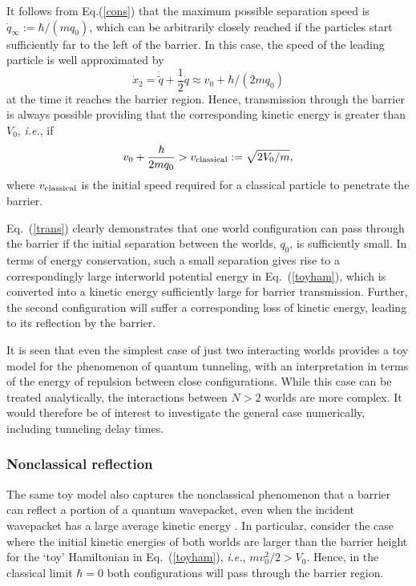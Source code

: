 \documentclass[twocolumn,aps,pra,amsmath,amssymb,superscriptaddress]{revtex4}
\newcommand{\ie}{{\em i.e.}}
\renewcommand{\(}{\left(}
\renewcommand{\)}{\right)}
\newcommand{\blk}{\color{black}}
\newcommand{\blu}{\color{blue}}
\renewcommand\blu{\blk}
\begin{document}
It follows from Eq.(\ref{cons}) that the maximum possible separation speed is
$\dot{q}_\infty:=\hbar/(mq_0)$,
which can be arbitrarily closely reached if the particles start sufficiently far to the left of the barrier. In this case, the speed of the leading particle is well approximated by 
\[ \dot{x}_2 = \dot{\tilde{q}} +\frac{1}{2}\dot{q} \approx v_0+\hbar/(2mq_0)\] 
at the time it reaches the barrier region.  Hence, transmission through the barrier is always possible providing that the corresponding kinetic energy is greater than $V_0$, \ie, if 
\begin{equation} \label{trans} 
v_0 + \frac{\hbar}{2mq_0} > v_{\rm classical} :=\sqrt{2V_0/m} ,
\end{equation}
\blu where \blk $v_{\rm classical}$ is the initial speed required for a classical particle to penetrate the barrier.  

Eq.~(\ref{trans}) \blk clearly demonstrates that one world configuration can pass through the barrier if the initial separation between the worlds, $q_0$, is sufficiently small. In terms of energy conservation, such a small separation gives rise to a correspondingly large interworld potential energy in Eq.~(\ref{toyham}), which is converted into a  kinetic energy sufficiently large for barrier transmission.  Further, the second configuration will suffer a corresponding loss of kinetic energy, leading to its reflection by the barrier.  

It is seen that even the simplest case of just two interacting worlds  provides a toy model for the phenomenon of quantum tunneling, with an interpretation in terms of the energy of repulsion between close \blk configurations. While this case can be treated analytically, the interactions between $N>2$ worlds are more complex.  It would therefore be of interest to investigate the general case numerically, including tunneling delay times.


\subsubsection{Nonclassical reflection}
 

The same toy model also captures the nonclassical phenomenon that a barrier can reflect a portion of a quantum wavepacket, even when the incident wavepacket has a large average kinetic energy \cite{merz}.  In particular, consider the case where the initial kinetic energies of both worlds are  larger than the barrier height for the `toy' Hamiltonian in Eq.~(\ref{toyham}), \ie, $mv_0^2/2>V_0$.  Hence, in the classical limit $\hbar = 0$ both configurations will pass through the barrier region. 
\end{document}
